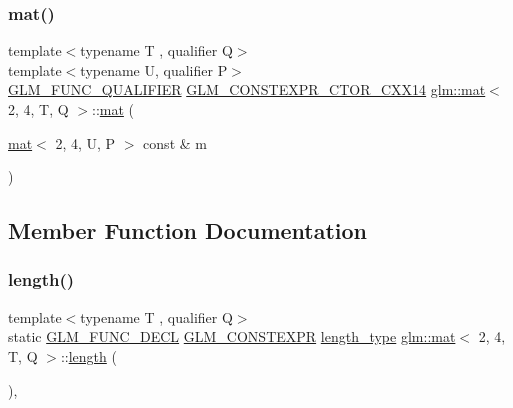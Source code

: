 \mbox{\label{structglm_1_1mat_3_012_00_014_00_01_t_00_01_q_01_4_a0fba6a2c0edf428cb93057e2eca9f7ad}} 
\subsubsection{\texorpdfstring{mat()}{mat()}\hspace{0.1cm}{\footnotesize\ttfamily [21/21]}}
{\footnotesize\ttfamily template$<$typename T , qualifier Q$>$ \\
template$<$typename U, qualifier P$>$ \\
\mbox{\hyperlink{setup_8hpp_a33fdea6f91c5f834105f7415e2a64407}{G\+L\+M\+\_\+\+F\+U\+N\+C\+\_\+\+Q\+U\+A\+L\+I\+F\+I\+ER}} \mbox{\hyperlink{setup_8hpp_a0900f9145e68bf6061b6f5e7be3fa751}{G\+L\+M\+\_\+\+C\+O\+N\+S\+T\+E\+X\+P\+R\+\_\+\+C\+T\+O\+R\+\_\+\+C\+X\+X14}} \mbox{\hyperlink{structglm_1_1mat}{glm\+::mat}}$<$ 2, 4, T, Q $>$\+::\mbox{\hyperlink{structglm_1_1mat}{mat}} (\begin{DoxyParamCaption}\item[{\mbox{\hyperlink{structglm_1_1mat}{mat}}$<$ 2, 4, U, P $>$ const \&}]{m }\end{DoxyParamCaption})}



\subsection{Member Function Documentation}
\mbox{\label{structglm_1_1mat_3_012_00_014_00_01_t_00_01_q_01_4_a52f7dc5b855a6dab6b479a3bcf29357b}} 
\subsubsection{\texorpdfstring{length()}{length()}}
{\footnotesize\ttfamily template$<$typename T , qualifier Q$>$ \\
static \mbox{\hyperlink{setup_8hpp_ab2d052de21a70539923e9bcbf6e83a51}{G\+L\+M\+\_\+\+F\+U\+N\+C\+\_\+\+D\+E\+CL}} \mbox{\hyperlink{setup_8hpp_a08b807947b47031d3a511f03f89645ad}{G\+L\+M\+\_\+\+C\+O\+N\+S\+T\+E\+X\+PR}} \mbox{\hyperlink{structglm_1_1mat_3_012_00_014_00_01_t_00_01_q_01_4_a5295c484627e965d615f3367c2ca45d8}{length\+\_\+type}} \mbox{\hyperlink{structglm_1_1mat}{glm\+::mat}}$<$ 2, 4, T, Q $>$\+::\mbox{\hyperlink{_s_d_l__opengl__glext_8h_ab9c919755bde3b34349e23a32b4e0fa7}{length}} (\begin{DoxyParamCaption}{ }\end{DoxyParamCaption})\hspace{0.3cm}{\ttfamily [inline]}, {\ttfamily [static]}}

